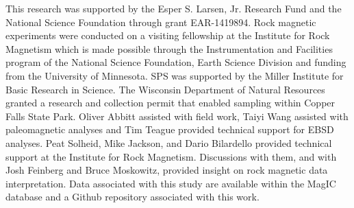 \documentclass[draft]{agujournal2018}
\begin{document}
%
%
%
%
%
%
%
%


\acknowledgments
This research was supported by the Esper S. Larsen, Jr. Research Fund and the National Science Foundation through grant EAR-1419894. Rock magnetic experiments were conducted on a visiting fellowship at the Institute for Rock Magnetism which is made possible through the Instrumentation and Facilities program of the National Science Foundation, Earth Science Division and funding from the University of Minnesota. SPS was supported by the Miller Institute for Basic Research in Science. The Wisconsin Department of Natural Resources granted a research and collection permit that enabled sampling within Copper Falls State Park. Oliver Abbitt assisted with field work, Taiyi Wang assisted with paleomagnetic analyses and Tim Teague provided technical support for EBSD analyses. Peat Solheid, Mike Jackson, and Dario Bilardello provided technical support at the Institute for Rock Magnetism. Discussions with them, and with Josh Feinberg and Bruce Moskowitz, provided insight on rock magnetic data interpretation. Data associated with this study are available within the MagIC database and a Github repository associated with this work.



%

%





\end{document}
